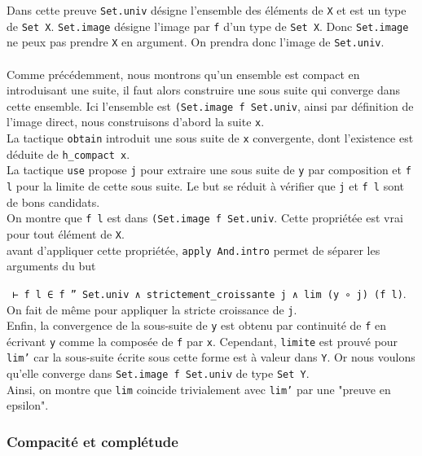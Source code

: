 \documentclass[a4paper, 12pt]{article}
\newcommand{\lean}[1]{\texttt{#1}}
\begin{document}
Dans cette preuve \lean{Set.univ} désigne l'ensemble des éléments de \lean{X} et est un type de \lean{Set X}. \lean{Set.image} désigne l'image par \lean{f} d'un type de \lean{Set X}. Donc \lean{Set.image} ne peux pas prendre \lean{X} en argument. On prendra donc l'image de \lean{Set.univ}.\\\\

Comme précédemment, nous montrons qu'un ensemble est compact en introduisant une suite, il faut alors construire une sous suite qui converge dans cette ensemble. Ici l'ensemble est \lean{(Set.image f Set.univ}, ainsi par définition de l'image direct, nous construisons d'abord la suite \lean{x}.\\

La tactique \lean{obtain} introduit une sous suite de \lean{x} convergente, dont l'existence est déduite de \lean{h_compact x}.\\

La tactique \lean{use} propose \lean{j} pour extraire une sous suite de \lean{y} par composition et \lean{f l} pour la limite de cette sous suite. Le but se réduit à vérifier que \lean{j} et \lean{f l} sont de bons candidats.\\

On montre que \lean{f l} est dans \lean{(Set.image f Set.univ}. Cette propriétée est vrai pour tout élément de \lean{X}. \\

avant d'appliquer cette propriétée, \lean{apply And.intro} permet de séparer les arguments du but

\lean{ ⊢ f l ∈ f '' Set.univ ∧ strictement_croissante j ∧ lim (y ∘ j) (f l)}. On fait de même pour appliquer la stricte croissance de \lean{j}. \\

Enfin, la convergence de la sous-suite de \lean{y} est obtenu par continuité de \lean{f} en écrivant \lean{y} comme la composée de \lean{f} par \lean{x}. Cependant, \lean{limite} est prouvé pour \lean{lim'} car la sous-suite écrite sous cette forme est à valeur dans \lean{Y}. Or nous voulons qu'elle converge dans \lean{Set.image f Set.univ} de type \lean{Set Y}.\\

Ainsi, on montre que \lean{lim} coincide trivialement avec \lean{lim'} par une "preuve en epsilon".

\vspace{\baselineskip}

\subsubsection{Compacité et complétude}
\end{document}
